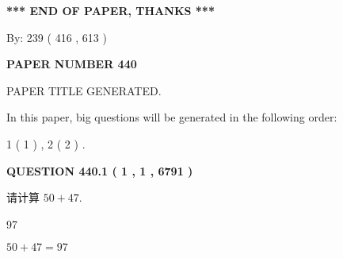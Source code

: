 \documentclass{ctexart}
\begin{document}
   
   
   
\vspace{1.0in} 
{\textbf{\large{ *** END OF PAPER, THANKS *** }}} 
   
   
\hspace{1.0in} By: 
 239 ( 416 ,  613 )
   
   
   
   
\newpage 
\setcounter{page}{ 
   440001 } 
   
   
   
   
 {\textbf{ \Large{ PAPER NUMBER  440  }}}
   
   
\vspace{0.2in}
   
   
   
   
   
   
   
   
 \vspace{0.2in}
 
 
 
 
   
   
 PAPER TITLE GENERATED.
   
   
   
\vspace{0.2in}
   
In this paper, big questions will be generated in the following order: 
   
   
   1 ( 1 )
 ,
   2 ( 2 )
 .
  
\vspace{0.2in}
  
{\textbf{\Large{QUESTION
440.1 
 ( 1 , 1 , 6791 )
}}}
  
  
 
请计算 $ %
50 +  %
47 $.
 
 
 
\noindent{}
 
 

97
 
 
\noindent{}
 
 

 
 
 
\noindent{}
 
 

$ %
50 +  %
47=   %
97$
 
\end{document}
